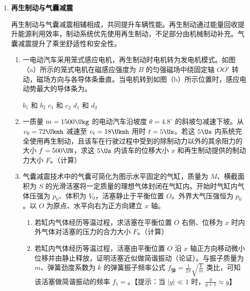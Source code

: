 \documentclass[\gkver]{gaokaozhenti}
\begin{document}
\begin{enumerate}
\item
\textbf{再生制动与气囊减震}

再生制动与气囊减震相辅相成，共同提升车辆性能。再生制动通过能量回收提升能源利用效率，制动系统优先使用再生制动，不足部分由机械制动补充。气囊减震提升了乘坐舒适性和安全性。

\begin{enumerate}
	\item
	一电动汽车采用笼式感应电机，再生制动时电机转为发电机模式。如图（a）所示的笼式电机在磁感应强度为 $B$ 的匀强磁场中绕固定轴 $OO'$ 转动，磁场方向与各导体条垂直。当电机转到如图（b）所示位置时，感应电动势最大的导体条为。

	{$b_{1}$ 和 $b_{2}$}
	{$c_{1}$ 和 $c_{2}$}
	{$d_{1}$ 和 $d_{2}$}

	\item
	一质量 $m=1500 \Ukg$ 的电动汽车沿坡度 $\theta=4.8^{\circ}$ 的斜坡匀减速下坡。从 $v_{0}=72 \Ukmh$ 减速至 $v_{t}=18 \Ukmh$ 用时 $t=5 \Us$。若这 $5 \Us$ 内系统完全使用再生制动，且该车在行驶过程中受到的除制动力以外的其余阻力的大小 $f=500 \UN$，求这 $5 \Us$ 内该车的位移大小 $x$ 和再生制动提供的制动力大小 $F$。（计算）

	\item
	气囊减震技术中的气囊可简化为图示水平固定的气缸，质量为 $M$、横截面积为 $S$ 的光滑活塞将一定质量的理想气体封闭在气缸内。开始时气缸内气体压强为 $p_{0}$、体积为 $V_{0}$，活塞静止于平衡位置 $O$。外界大气压强恒为 $p_{0}$。以 $O$ 为原点、水平向右为正方向建立 $x$ 轴。

	\onepicture[h=2.6cm, align=right]{}

	\begin{enumerate}
		\item
		若缸内气体经历等温过程，求活塞在平衡位置 $O$ 右侧、位移为 $x$ 时内外气体对活塞的压力的合力大小 $F$。（计算）

		\item
		若缸内气体经历等温过程，活塞由平衡位置 $O$ 沿 $x$ 轴正方向移动微小位移并由静止释放，证明活塞近似做简谐振动（论证）。与振子质量为 $m$、弹簧劲度系数为 $k$ 的弹簧振子频率公式 $f_{\text{弹}}=\frac{1}{2\pi}\sqrt{\frac{k}{m}}$ 类比，可知该活塞做简谐振动的频率 $f_{1}=$。【提示：当 $|y|\ll 1$ 时，$\frac{y}{y+1}\approx y$】


\end{enumerate}
\end{enumerate}
\end{enumerate}
\end{document}
